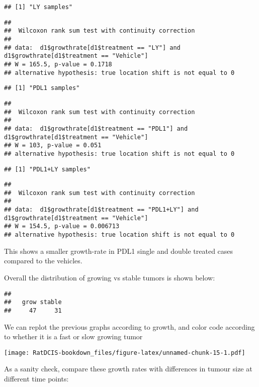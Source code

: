 \documentclass[
]{book}
\begin{document}
\begin{verbatim}
## [1] "LY samples"
\end{verbatim}

\begin{verbatim}
## 
##  Wilcoxon rank sum test with continuity correction
## 
## data:  d1$growthrate[d1$treatment == "LY"] and d1$growthrate[d1$treatment == "Vehicle"]
## W = 165.5, p-value = 0.1718
## alternative hypothesis: true location shift is not equal to 0
\end{verbatim}

\begin{verbatim}
## [1] "PDL1 samples"
\end{verbatim}

\begin{verbatim}
## 
##  Wilcoxon rank sum test with continuity correction
## 
## data:  d1$growthrate[d1$treatment == "PDL1"] and d1$growthrate[d1$treatment == "Vehicle"]
## W = 103, p-value = 0.051
## alternative hypothesis: true location shift is not equal to 0
\end{verbatim}

\begin{verbatim}
## [1] "PDL1+LY samples"
\end{verbatim}

\begin{verbatim}
## 
##  Wilcoxon rank sum test with continuity correction
## 
## data:  d1$growthrate[d1$treatment == "PDL1+LY"] and d1$growthrate[d1$treatment == "Vehicle"]
## W = 154.5, p-value = 0.006713
## alternative hypothesis: true location shift is not equal to 0
\end{verbatim}

This shows a smaller growth-rate in PDL1 single and double treated cases compared to the vehicles.

Overall the distribution of growing vs stable tumors is shown below:

\begin{verbatim}
## 
##   grow stable 
##     47     31
\end{verbatim}

We can replot the previous graphs according to growth, and color code according to whether it is a fast or slow growing tumor

\texttt{[image: RatDCIS-bookdown\_files/figure-latex/unnamed-chunk-15-1.pdf]}

As a sanity check, compare these growth rates with differences in tumour size at different time points:
\end{document}

